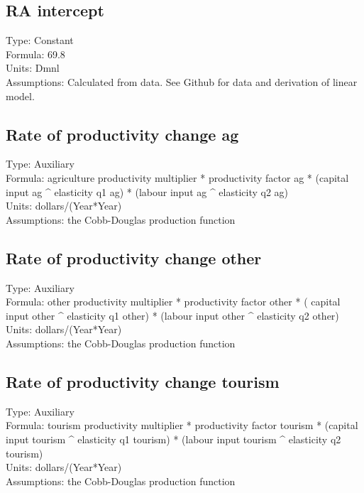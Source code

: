 \documentclass[
  11pt,
]{book}
\begin{document}
\hypertarget{ra-intercept}{%
\subsection{RA intercept}\label{ra-intercept}}

Type: Constant\\
Formula: 69.8\\
Units: Dmnl\\
Assumptions: Calculated from data. See Github for data and derivation of linear model.

\hypertarget{rate-of-productivity-change-ag}{%
\subsection{Rate of productivity change ag}\label{rate-of-productivity-change-ag}}

Type: Auxiliary\\
Formula: agriculture productivity multiplier * productivity factor ag * (capital input ag \^{} elasticity q1 ag) * (labour input ag \^{} elasticity q2 ag)\\
Units: dollars/(Year*Year)\\
Assumptions: the Cobb-Douglas production function

\hypertarget{rate-of-productivity-change-other}{%
\subsection{Rate of productivity change other}\label{rate-of-productivity-change-other}}

Type: Auxiliary\\
Formula: other productivity multiplier * productivity factor other * ( capital input other \^{} elasticity q1 other) * (labour input other \^{} elasticity q2 other)\\
Units: dollars/(Year*Year)\\
Assumptions: the Cobb-Douglas production function

\hypertarget{rate-of-productivity-change-tourism}{%
\subsection{Rate of productivity change tourism}\label{rate-of-productivity-change-tourism}}

Type: Auxiliary\\
Formula: tourism productivity multiplier * productivity factor tourism * (capital input tourism \^{} elasticity q1 tourism) * (labour input tourism \^{} elasticity q2 tourism)\\
Units: dollars/(Year*Year)\\
Assumptions: the Cobb-Douglas production function
\end{document}
